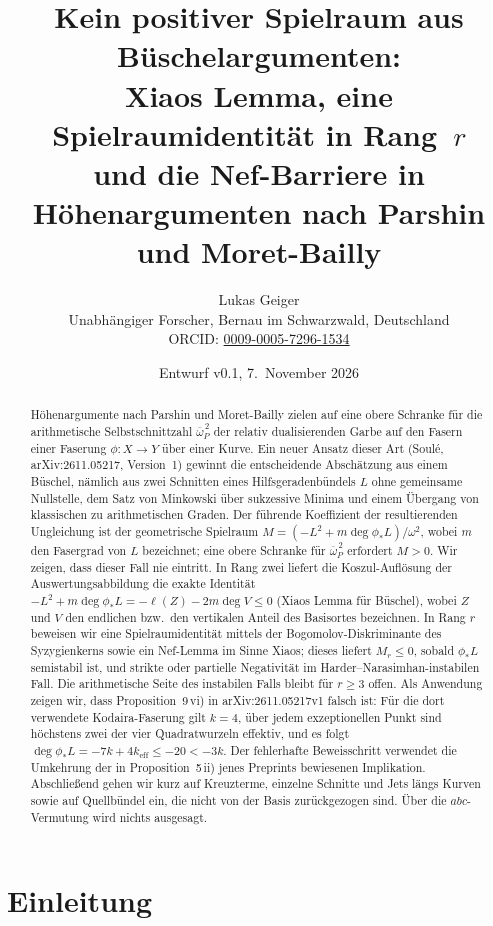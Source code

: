 \documentclass[11pt]{article}
\title{Kein positiver Spielraum aus Büschelargumenten:\\ Xiaos Lemma, eine Spielraumidentität in Rang~$r$\\ und die Nef-Barriere in Höhenargumenten nach Parshin und Moret-Bailly}
\author{Lukas Geiger\\
Unabhängiger Forscher, Bernau im Schwarzwald, Deutschland\\
ORCID: \href{https://orcid.org/0009-0005-7296-1534}{0009-0005-7296-1534}}
\date{Entwurf v0.1, 7.~November 2026}
\theoremstyle{definition}
\theoremstyle{remark}
\newcommand{\ob}{\overline{\omega}}
\begin{document}
\maketitle

\begin{abstract}
Höhenargumente nach Parshin und Moret-Bailly zielen auf eine obere Schranke für
die arithmetische Selbstschnittzahl $\ob_P^{\,2}$ der relativ dualisierenden Garbe
auf den Fasern einer Faserung $\phi\colon X\to Y$ über einer Kurve. Ein neuer
Ansatz dieser Art (Soul\'e, arXiv:2611.05217, Version~1) gewinnt die
entscheidende Abschätzung aus einem Büschel, nämlich aus zwei Schnitten eines
Hilfsgeradenbündels $L$ ohne gemeinsame Nullstelle, dem Satz von Minkowski über
sukzessive Minima und einem Übergang von klassischen zu arithmetischen Graden. Der
führende Koeffizient der resultierenden Ungleichung ist der geometrische
Spielraum $M=(-L^2+m\deg\phi_*L)/\omega^2$, wobei $m$ den Fasergrad von $L$
bezeichnet; eine obere Schranke für $\ob_P^{\,2}$ erfordert $M>0$. Wir zeigen,
dass dieser Fall nie eintritt. In Rang zwei liefert die Koszul-Auflösung der
Auswertungsabbildung die exakte Identität
$-L^2+m\deg\phi_*L=-\ell(Z)-2m\deg V\le 0$ (Xiaos Lemma für Büschel), wobei $Z$
und $V$ den endlichen bzw.\ den vertikalen Anteil des Basisortes bezeichnen. In
Rang $r$ beweisen wir eine Spielraumidentität mittels der
Bogomolov-Diskriminante des Syzygienkerns sowie ein Nef-Lemma im Sinne Xiaos;
dieses liefert $M_r\le 0$, sobald $\phi_*L$ semistabil ist, und strikte oder
partielle Negativität im Harder--Narasimhan-instabilen Fall. Die arithmetische
Seite des instabilen Falls bleibt für $r\ge 3$ offen. Als Anwendung zeigen wir,
dass Proposition~9\,vi) in arXiv:2611.05217v1 falsch ist: Für die dort verwendete
Kodaira-Faserung gilt $k=4$, über jedem exzeptionellen Punkt sind höchstens zwei
der vier Quadratwurzeln effektiv, und es folgt $\deg\phi_*L=-7k+4k_{\mathrm{eff}}\le
-20<-3k$. Der fehlerhafte Beweisschritt verwendet die Umkehrung der in
Proposition~5\,ii) jenes Preprints bewiesenen Implikation. Abschließend gehen wir
kurz auf Kreuzterme, einzelne Schnitte und Jets längs Kurven sowie auf Quellbündel
ein, die nicht von der Basis zurückgezogen sind. Über die $abc$-Vermutung wird
nichts ausgesagt.
\end{abstract}

\section{Einleitung}\label{sec:intro}
\end{document}
